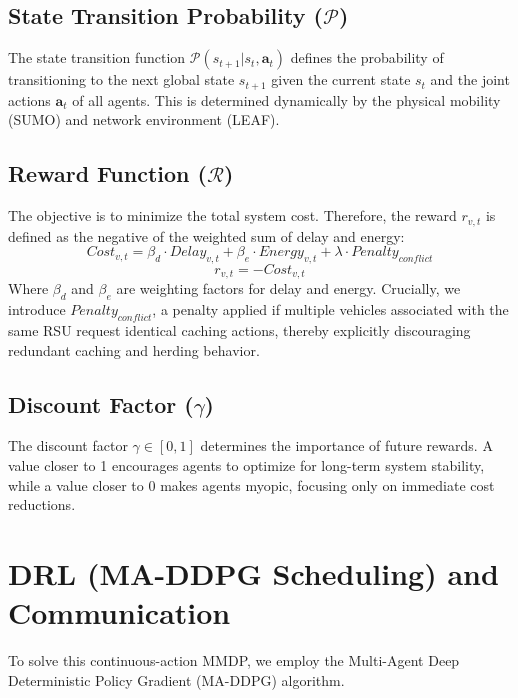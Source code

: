 \documentclass[12pt,a4paper]{report}
\begin{document}
\subsection{State Transition Probability ($\mathcal{P}$)}
The state transition function $\mathcal{P}(s_{t+1} | s_t, \boldsymbol{a}_t)$ defines the probability of transitioning to the next global state $s_{t+1}$ given the current state $s_t$ and the joint actions $\boldsymbol{a}_t$ of all agents. This is determined dynamically by the physical mobility (SUMO) and network environment (LEAF).

\subsection{Reward Function ($\mathcal{R}$)}
The objective is to minimize the total system cost. Therefore, the reward $r_{v,t}$ is defined as the negative of the weighted sum of delay and energy:
\begin{equation}
    Cost_{v,t} = \beta_d \cdot Delay_{v,t} + \beta_e \cdot Energy_{v,t} + \lambda \cdot Penalty_{conflict}
\end{equation}
\begin{equation}
    r_{v,t} = - Cost_{v,t}
\end{equation}
Where $\beta_d$ and $\beta_e$ are weighting factors for delay and energy. Crucially, we introduce $Penalty_{conflict}$, a penalty applied if multiple vehicles associated with the same RSU request identical caching actions, thereby explicitly discouraging redundant caching and herding behavior.

\subsection{Discount Factor ($\gamma$)}
The discount factor $\gamma \in [0, 1]$ determines the importance of future rewards. A value closer to 1 encourages agents to optimize for long-term system stability, while a value closer to 0 makes agents myopic, focusing only on immediate cost reductions.

\section{DRL (MA-DDPG Scheduling) and Communication}
To solve this continuous-action MMDP, we employ the Multi-Agent Deep Deterministic Policy Gradient (MA-DDPG) algorithm.
\end{document}
